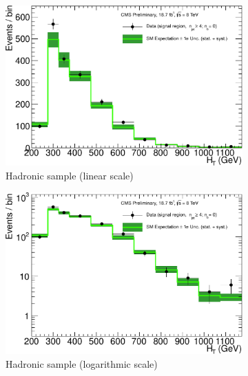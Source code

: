 \clearpage
\begin{figure}[h!]
  \centering
  \begin{subfigure}[b]{0.48\textwidth}
    \includegraphics[width=\textwidth]
    {Figs/results/v0/greenBand/single_plots/hadronic_0b_ge4j.pdf}
    \caption{Hadronic sample (linear scale)}
  \end{subfigure}
  \vspace{0.7cm}\begin{subfigure}[b]{0.48\textwidth}
    \includegraphics[width=\textwidth]
    {Figs/results/v0/greenBand/single_plots/hadronic_0b_ge4j_logy.pdf}
    \caption{Hadronic sample (logarithmic scale)}
  \end{subfigure}
  \begin{subfigure}[b]{0.48\textwidth}

\end{subfigure}
\end{figure}
